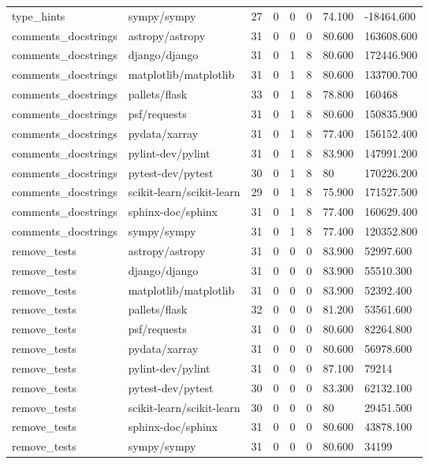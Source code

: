 \begin{tabular}{llllllll}
type\_hints & sympy/sympy & 27 & 0 & 0 & 0 & 74.100 & -18464.600 \\
comments\_docstrings & astropy/astropy & 31 & 0 & 0 & 0 & 80.600 & 163608.600 \\
comments\_docstrings & django/django & 31 & 0 & 1 & 8 & 80.600 & 172446.900 \\
comments\_docstrings & matplotlib/matplotlib & 31 & 0 & 1 & 8 & 80.600 & 133700.700 \\
comments\_docstrings & pallets/flask & 33 & 0 & 1 & 8 & 78.800 & 160468 \\
comments\_docstrings & psf/requests & 31 & 0 & 1 & 8 & 80.600 & 150835.900 \\
comments\_docstrings & pydata/xarray & 31 & 0 & 1 & 8 & 77.400 & 156152.400 \\
comments\_docstrings & pylint-dev/pylint & 31 & 0 & 1 & 8 & 83.900 & 147991.200 \\
comments\_docstrings & pytest-dev/pytest & 30 & 0 & 1 & 8 & 80 & 170226.200 \\
comments\_docstrings & scikit-learn/scikit-learn & 29 & 0 & 1 & 8 & 75.900 & 171527.500 \\
comments\_docstrings & sphinx-doc/sphinx & 31 & 0 & 1 & 8 & 77.400 & 160629.400 \\
comments\_docstrings & sympy/sympy & 31 & 0 & 1 & 8 & 77.400 & 120352.800 \\
remove\_tests & astropy/astropy & 31 & 0 & 0 & 0 & 83.900 & 52997.600 \\
remove\_tests & django/django & 31 & 0 & 0 & 0 & 83.900 & 55510.300 \\
remove\_tests & matplotlib/matplotlib & 31 & 0 & 0 & 0 & 83.900 & 52392.400 \\
remove\_tests & pallets/flask & 32 & 0 & 0 & 0 & 81.200 & 53561.600 \\
remove\_tests & psf/requests & 31 & 0 & 0 & 0 & 80.600 & 82264.800 \\
remove\_tests & pydata/xarray & 31 & 0 & 0 & 0 & 80.600 & 56978.600 \\
remove\_tests & pylint-dev/pylint & 31 & 0 & 0 & 0 & 87.100 & 79214 \\
remove\_tests & pytest-dev/pytest & 30 & 0 & 0 & 0 & 83.300 & 62132.100 \\
remove\_tests & scikit-learn/scikit-learn & 30 & 0 & 0 & 0 & 80 & 29451.500 \\
remove\_tests & sphinx-doc/sphinx & 31 & 0 & 0 & 0 & 80.600 & 43878.100 \\
remove\_tests & sympy/sympy & 31 & 0 & 0 & 0 & 80.600 & 34199 \\
\bottomrule
\end{tabular}
